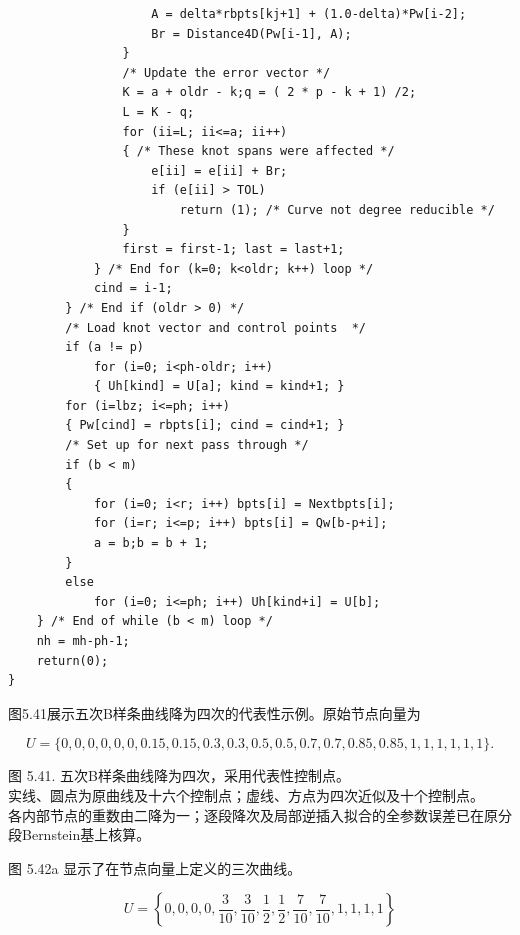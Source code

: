 \documentclass[../main.tex]{subfiles}
\begin{document}
\begin{verbatim}
                    A = delta*rbpts[kj+1] + (1.0-delta)*Pw[i-2];
                    Br = Distance4D(Pw[i-1], A);
                }
                /* Update the error vector */
                K = a + oldr - k;q = ( 2 * p - k + 1) /2;
                L = K - q;
                for (ii=L; ii<=a; ii++)
                { /* These knot spans were affected */
                    e[ii] = e[ii] + Br;
                    if (e[ii] > TOL)
                        return (1); /* Curve not degree reducible */
                }
                first = first-1; last = last+1;
            } /* End for (k=0; k<oldr; k++) loop */
            cind = i-1;
        } /* End if (oldr > 0) */
        /* Load knot vector and control points  */
        if (a != p)
            for (i=0; i<ph-oldr; i++)
            { Uh[kind] = U[a]; kind = kind+1; }
        for (i=lbz; i<=ph; i++)
        { Pw[cind] = rbpts[i]; cind = cind+1; }
        /* Set up for next pass through */
        if (b < m)
        {
            for (i=0; i<r; i++) bpts[i] = Nextbpts[i];
            for (i=r; i<=p; i++) bpts[i] = Qw[b-p+i];
            a = b;b = b + 1;
        }
        else
            for (i=0; i<=ph; i++) Uh[kind+i] = U[b];
    } /* End of while (b < m) loop */
    nh = mh-ph-1;
    return(0);
}
\end{verbatim}

图5.41展示五次B样条曲线降为四次的代表性示例。原始节点向量为

\[U=\{0,0,0,0,0,0,0.15,0.15,0.3,0.3,0.5,0.5,0.7,0.7,0.85,0.85,1,1,1,1,1,1\}.\]

\begin{center}
\begin{minipage}{23cm}
\vspace*{.6\baselineskip}
\centering
{}
\par\smallskip
图 5.41. 五次B样条曲线降为四次，采用代表性控制点。\\
实线、圆点为原曲线及十六个控制点；虚线、方点为四次近似及十个控制点。\\
各内部节点的重数由二降为一；逐段降次及局部逆插入拟合的全参数误差已在原分段Bernstein基上核算。
\end{minipage}
\end{center}

图 5.42a 显示了在节点向量上定义的三次曲线。

\[
U = \left\{  {0,0,0,0,\frac{3}{10},\frac{3}{10},\frac{1}{2},\frac{1}{2},\frac{7}{10},\frac{7}{10},1,1,1,1}\right\}
\]
\end{document}
